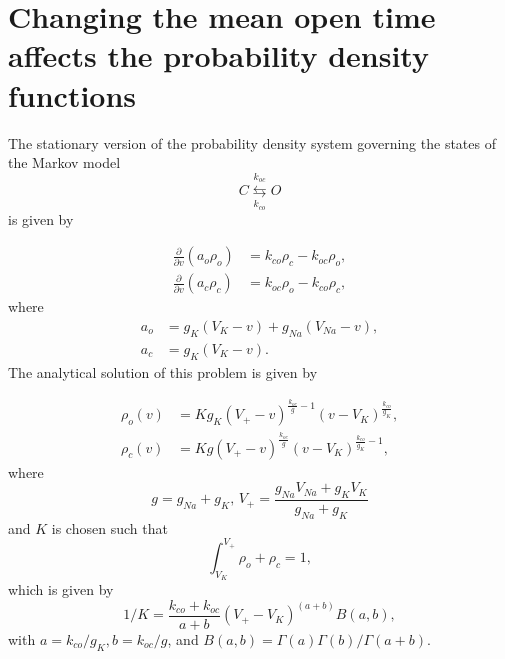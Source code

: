 

\section[Changing MOT affects the PDFs]{Changing the mean open time affects the probability density functions}

The stationary version of the probability density system governing the states
of the Markov model%
\[
C\underset{k_{co}}{\overset{k_{oc}}{\leftrightarrows}}O
\]
is given by%

\begin{align}
\frac{\partial}{\partial v}\left(  a_{o}\rho_{o}\right)   &  =k_{co}\rho
_{c}-k_{oc}\rho_{o},\label{vpdf_mot}\\
\frac{\partial}{\partial v}\left(  a_{c}\rho_{c}\right)   &  =k_{oc}\rho
_{o}-k_{co}\rho_{c},\nonumber
\end{align}
where 
\begin{align}
a_{o}  &  =g_{K}(V_{K}-v)+g_{Na}(V_{Na}-v),\label{vflux_mot}\\
a_{c}  &  =g_{K}(V_{K}-v).\nonumber
\end{align}
The analytical solution of this problem is given by%

\begin{align*}
\rho_{o}(v)  &  =Kg_{K}(V_{+}-v)^{\frac{k_{oc}}{g}-1}(v-V_{K})^{\frac{k_{co}%
}{g_{K}}},\\
\rho_{c}(v)  &  =Kg(V_{+}-v)^{\frac{k_{oc}}{g}}(v-V_{K})^{\frac{k_{co}}{g_{K}}-1},%
\end{align*}
where
\[
g=g_{Na}+g_{K}\text{, }V_{+}=\frac{g_{Na}V_{Na}+g_{K}V_{K}}{g_{Na}+g_{K}}%
\]
and $K$ is chosen such that%
\[
\int_{V_{K}}^{V_{+}}\rho_{o}+\rho_{c}=1,
\]
which is given by
\[
1/K=\frac{k_{co}+k_{oc}}{a+b} (V_+-V_K)^{(a+b)} B(a,b),
\]
with $a = k_{co}/g_{K}, b = k_{oc}/g$, and $B(a,b) =\Gamma(a)\Gamma(b)/\Gamma(a+b)$.


